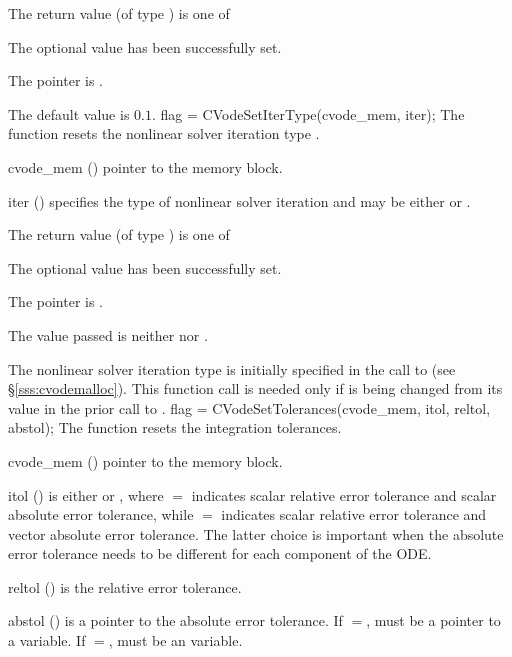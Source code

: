 {
  The return value  (of type ) is one of
  \begin{args}
  \item[\Id{CV\_SUCCESS}] 
    The optional value has been successfully set.
  \item[\Id{CV\_MEM\_NULL}]
    The  pointer is .
  \end{args}
}
{
  The default value is $0.1$.
}
{
flag = CVodeSetIterType(cvode\_mem, iter);
}
{
  The function  resets the nonlinear solver
  iteration type .
}
{
  \begin{args}
  \item[cvode\_mem] ()
    pointer to the {\cvode} memory block.
  \item[iter] ()
    specifies the type of nonlinear solver iteration and may be
    either  or . 
  \end{args}
}
{
  The return value  (of type ) is one of
  \begin{args}
  \item[\Id{CV\_SUCCESS}] 
    The optional value has been successfully set.
  \item[\Id{CV\_MEM\_NULL}]
    The  pointer is .
  \item[\Id{CV\_ILL\_INPUT}]
    The  value passed is neither  nor .
  \end{args}
}
{
  The nonlinear solver iteration type is initially specified in the call
  to  (see \S\ref{sss:cvodemalloc}). This function call is
  needed only if  is being changed from its value in the prior call 
  to .
}
{
flag = CVodeSetTolerances(cvode\_mem, itol, reltol, abstol);
}
{
  The function  resets the integration tolerances.
}
{
  \begin{args}
  \item[cvode\_mem] ()
    pointer to the {\cvodes} memory block.
  \item[itol] () 
    is either  or , where $=$ indicates
    scalar relative error tolerance and scalar absolute error tolerance, while
    $=$ indicates scalar relative error tolerance and vector
    absolute error tolerance.  The latter choice is important when the absolute
    error tolerance needs to be different for each component of the ODE. 
  \item[reltol] ()
    is the relative error tolerance.
  \item[abstol] ()
    is a pointer to the absolute error tolerance. If $=$, 
    must be a pointer to a  variable. If $=$, 
    must be an  variable.
  \end{args}
}
